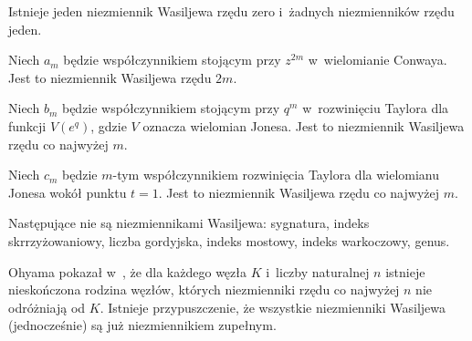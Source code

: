 Istnieje jeden niezmiennik Wasiljewa rzędu zero i~żadnych niezmienników rzędu jeden.

\begin{example}
	Niech $a_m$ będzie współczynnikiem stojącym przy $z^{2m}$ w~wielomianie Conwaya.
	Jest to niezmiennik Wasiljewa rzędu $2m$.
\end{example}

\begin{example}
	Niech $b_m$ będzie współczynnikiem stojącym przy $q^m$ w~rozwinięciu Taylora dla funkcji $V(e^q)$, gdzie $V$ oznacza wielomian Jonesa.
	Jest to niezmiennik Wasiljewa rzędu co najwyżej $m$.
\end{example}

\begin{example}
	Niech $c_m$ będzie $m$-tym współczynnikiem rozwinięcia Taylora dla wielomianu Jonesa wokół punktu $t = 1$.
	Jest to niezmiennik Wasiljewa rzędu co najwyżej $m$.
\end{example}


Następujące nie są niezmiennikami Wasiljewa: sygnatura, indeks skrrzyżowaniowy, liczba gordyjska, indeks mostowy, indeks warkoczowy, genus.


Ohyama pokazał w~\cite{ohyama95}, że dla każdego węzła $K$ i~liczby naturalnej $n$ istnieje nieskończona rodzina węzłów, których niezmienniki rzędu co najwyżej $n$ nie odróżniają od $K$.
Istnieje przypuszczenie, że wszystkie niezmienniki Wasiljewa (jednocześnie) są już niezmiennikiem zupełnym.